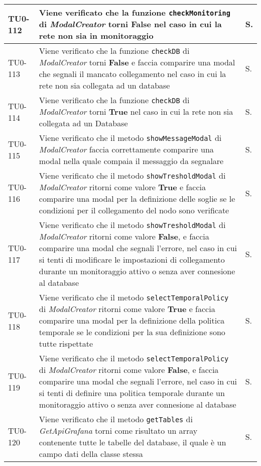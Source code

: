 \begin{longtable}{|C{.15\textwidth}|m{.66\textwidth}|C{.10\textwidth}|}
\hline
TU0-112 & Viene verificato che la funzione \texttt{checkMonitoring} di \textit{ModalCreator} torni \textbf{False} nel caso in cui la rete non sia in monitoraggio & S. \\
\hline
{}TU0-113 & Viene verificato che la funzione \texttt{checkDB} di \textit{ModalCreator} torni \textbf{False} e faccia comparire una modal che segnali il mancato collegamento nel caso in cui la rete non sia collegata ad un database & S. \\
\hline
TU0-114 & Viene verificato che la funzione \texttt{checkDB} di \textit{ModalCreator} torni \textbf{True} nel caso in cui la rete non sia collegata ad un Database & S. \\
\hline
{}TU0-115 & Viene verificato che il metodo \texttt{showMessageModal} di \textit{ModalCreator} faccia correttamente comparire una modal nella quale compaia il messaggio da segnalare & S. \\
\hline
TU0-116 & Viene verificato che il metodo \texttt{showTresholdModal} di \textit{ModalCreator} ritorni come valore \textbf{True} e faccia comparire una modal per la definizione delle soglie se le condizioni per il collegamento del nodo sono verificate & S. \\
\hline
{}TU0-117 & Viene verificato che il metodo \texttt{showTresholdModal} di \textit{ModalCreator} ritorni come valore \textbf{False}, e faccia comparire una modal che segnali l'errore, nel caso in cui si tenti di modificare le impostazioni di collegamento durante un monitoraggio attivo o senza aver connesione al database  & S. \\
\hline
TU0-118 & Viene verificato che il metodo \texttt{selectTemporalPolicy} di \textit{ModalCreator} ritorni come valore \textbf{True} e faccia comparire una modal per la definizione della politica temporale se le condizioni per la sua definizione sono tutte rispettate & S. \\
\hline
{}TU0-119 & Viene verificato che il metodo \texttt{selectTemporalPolicy} di \textit{ModalCreator} ritorni come valore \textbf{False}, e faccia comparire una modal che segnali l'errore, nel caso in cui si tenti di definire una politica temporale durante un monitoraggio attivo o senza aver connesione al database & S. \\
\hline
TU0-120 & Viene verificato che il metodo \texttt{getTables} di \textit{GetApiGrafana} torni come risultato un array contenente tutte le tabelle del database, il quale è un campo dati della classe stessa & S.\\

\end{longtable}
